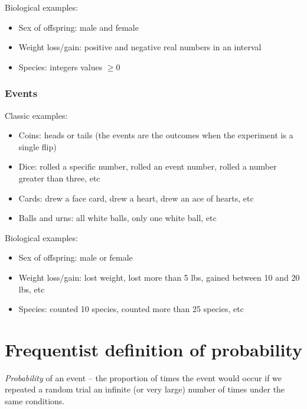 \documentclass[]{book}
\providecommand{\tightlist}{%
  \setlength{\itemsep}{0pt}\setlength{\parskip}{0pt}}
\theoremstyle{definition}
\theoremstyle{definition}
\theoremstyle{definition}
\theoremstyle{remark}
\begin{document}
Biological examples:

\begin{itemize}
\tightlist
\item
  Sex of offspring: male and female
\item
  Weight loss/gain: positive and negative real numbers in an interval
\item
  Species: integers values \(\geq 0\)
\end{itemize}

\hypertarget{events}{%
\subsubsection{Events}\label{events}}

Classic examples:

\begin{itemize}
\tightlist
\item
  Coins: heads or tails (the events are the outcomes when the experiment
  is a single flip)
\item
  Dice: rolled a specific number, rolled an event number, rolled a
  number greater than three, etc
\item
  Cards: drew a face card, drew a heart, drew an ace of hearts, etc
\item
  Balls and urns: all white balls, only one white ball, etc
\end{itemize}

Biological examples:

\begin{itemize}
\tightlist
\item
  Sex of offspring: male or female
\item
  Weight loss/gain: lost weight, lost more than 5 lbs, gained between 10
  and 20 lbs, etc
\item
  Species: counted 10 species, counted more than 25 species, etc
\end{itemize}

\hypertarget{frequentist-definition-of-probability}{%
\section{Frequentist definition of
probability}\label{frequentist-definition-of-probability}}

\emph{Probability} of an event -- the proportion of times the event
would occur if we repeated a random trial an infinite (or very large)
number of times under the same conditions.
\end{document}
